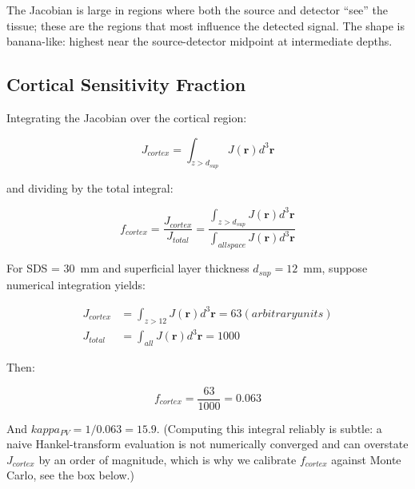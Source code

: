 \documentclass[12pt]{article}
\def\kappa{kappa}%
\def\text#1{#1}%
\def\,{ }%
\begin{document}
The Jacobian is large in regions where both the source and detector ``see'' the tissue; these are the regions that most influence the detected signal. The shape is banana-like: highest near the source-detector midpoint at intermediate depths.

\subsection{Cortical Sensitivity Fraction}

Integrating the Jacobian over the cortical region:

\begin{equation}
J_{\text{cortex}} = \int_{z > d_{\text{sup}}} J(\mathbf{r}) \, d^3\mathbf{r}
\end{equation}

and dividing by the total integral:

\begin{equation}
f_{\text{cortex}} = \frac{J_{\text{cortex}}}{J_{\text{total}}} = \frac{\int_{z > d_{\text{sup}}} J(\mathbf{r}) \, d^3\mathbf{r}}{\int_{\text{all space}} J(\mathbf{r}) \, d^3\mathbf{r}}
\end{equation}

\begin{workexample}
For SDS = 30~mm and superficial layer thickness $d_{\text{sup}} = 12$~mm, suppose numerical integration yields:

\begin{align}
J_{\text{cortex}} &= \int_{z > 12} J(\mathbf{r}) \, d^3\mathbf{r} = 63 \, \text{(arbitrary units)} \\
J_{\text{total}} &= \int_{\text{all}} J(\mathbf{r}) \, d^3\mathbf{r} = 1000
\end{align}

Then:

\begin{equation}
f_{\text{cortex}} = \frac{63}{1000} = 0.063
\end{equation}

And $\kappa_{\text{PV}} = 1 / 0.063 = 15.9$. (Computing this integral reliably is subtle: a naive Hankel-transform evaluation is not numerically converged and can overstate $J_{\text{cortex}}$ by an order of magnitude, which is why we calibrate $f_{\text{cortex}}$ against Monte Carlo, see the box below.)
\end{workexample}
\end{document}
